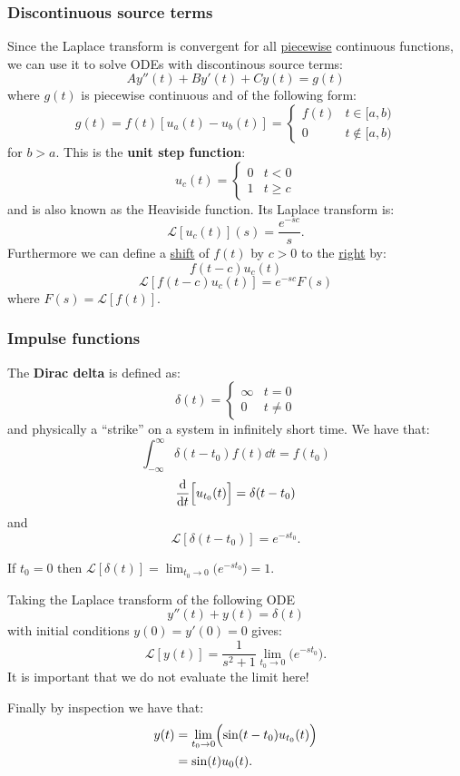 \documentclass{article}
\begin{document}
\subsubsection{Discontinuous source terms}
Since the Laplace transform is convergent for all \underline{piecewise}
continuous functions, we can use it to solve ODEs with 
discontinous source terms:
$$Ay''(t)+By'(t)+Cy(t)=g(t)$$
where $g(t)$ is piecewise continuous and of the following form:
$$g(t)=f(t)[u_a(t)-u_b(t)]
=\left\{
    \begin{array}{lr}
        f(t) & t\in[a,b) \\
        0 & t\notin[a,b)
    \end{array}
\right.$$
for $b>a$. This is the \textbf{unit step function}:
$$u_c(t)=\left\{
    \begin{array}{lr}
        0 & t<0 \\
        1 & t\geq c
    \end{array}
\right.$$
and is also known as the Heaviside function. Its Laplace transform is:
$$\mathcal{L}[u_c(t)](s)=\frac{e^{-sc}}{s}.$$
Furthermore we can define a \underline{shift} of $f(t)$ by $c>0$ to the 
\underline{right} by:
$$f(t-c)u_c(t)$$
$$\mathcal{L}[f(t-c)u_c(t)]=e^{-sc}F(s)$$
where $F(s)=\mathcal{L}[f(t)]$.

\subsubsection{Impulse functions}
The \textbf{Dirac delta} is defined as:
$$\delta(t)=\left\{
    \begin{array}{lr}
        \infty & t=0 \\
        0 & t\neq0
    \end{array}
\right.$$
and physically a ``strike'' on a system
in infinitely short time.
We have that:
$$\int_{-\infty}^{\infty}\delta(t-t_0)
f(t)\dd t=f(t_0)$$
$$\dv{t}\Bigl[u_{t_0}(t)\Bigr]
=\delta(t-t_0)$$
and
$$\mathcal{L}[\delta(t-t_0)]
=e^{-st_0}.$$

If $t_0=0$ then
$\displaystyle\mathcal{L}[\delta(t)]
=\lim_{t_0\rightarrow0}
\bigl(e^{-st_0}\bigr)=1$.

\newpage

Taking the Laplace transform of the following ODE
$$y''(t)+y(t)=\delta(t)$$
with initial conditions $y(0)=y'(0)=0$ gives:
$$\mathcal{L}[y(t)]
=\frac{1}{s^2+1}
\lim_{t_0\rightarrow0}\bigl(
e^{-s t_0}
\bigr).$$
It is important that we do not evaluate the limit here!

Finally by inspection we have that:
\begin{align*}
    y(t)
    &=\lim_{t_0\rightarrow0}
    \Bigl(\sin(t-t_0)u_{t_0}(t)\Bigr) \\
    &=\sin(t)u_0(t).
\end{align*}
\end{document}
